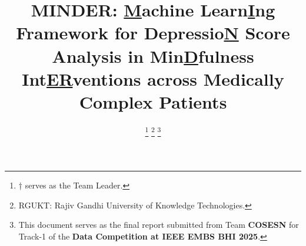 \documentclass[conference]{IEEEtran}
\begin{document}

\title{\LARGE \textbf{MINDER}: \underline{M}achine Learn\underline{I}ng Framework for Depressio\underline{N} Score Analysis in Min\underline{D}fulness Int\underline{ER}ventions across Medically Complex Patients}


\author{
\and
{}
\and
{}
\thanks{† serves as the Team Leader.}
\thanks{RGUKT: Rajiv Gandhi University of Knowledge Technologies.}
\thanks{This document serves as the final report submitted from Team \textbf{COSESN} for Track-1 of the \textbf{Data Competition at IEEE EMBS BHI 2025}.}
}

\maketitle
\end{document}
